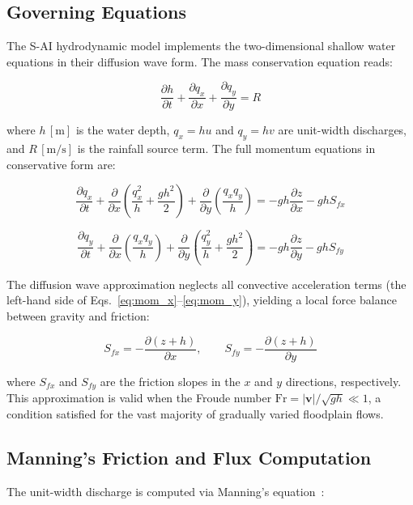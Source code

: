 \documentclass[11pt, a4paper]{article}
\newcommand{\vect}[1]{\boldsymbol{#1}}
\newcommand{\pd}[2]{\frac{\partial #1}{\partial #2}}
\begin{document}
\subsection{Governing Equations}

The S-AI hydrodynamic model implements the two-dimensional shallow water equations in their diffusion wave form. The mass conservation equation reads:

\begin{equation}
  \pd{h}{t} + \pd{q_x}{x} + \pd{q_y}{y} = R
  \label{eq:mass}
\end{equation}

\noindent where $h\,[\mathrm{m}]$ is the water depth, $q_x = hu$ and $q_y = hv$ are unit-width discharges, and $R\,[\mathrm{m/s}]$ is the rainfall source term. The full momentum equations in conservative form are:

\begin{equation}
  \pd{q_x}{t} + \pd{}{x}\!\left(\frac{q_x^2}{h} + \frac{gh^2}{2}\right) + \pd{}{y}\!\left(\frac{q_x q_y}{h}\right) = -gh\pd{z}{x} - ghS_{fx}
  \label{eq:mom_x}
\end{equation}

\begin{equation}
  \pd{q_y}{t} + \pd{}{x}\!\left(\frac{q_x q_y}{h}\right) + \pd{}{y}\!\left(\frac{q_y^2}{h} + \frac{gh^2}{2}\right) = -gh\pd{z}{y} - ghS_{fy}
  \label{eq:mom_y}
\end{equation}

The diffusion wave approximation neglects all convective acceleration terms (the left-hand side of Eqs.~\ref{eq:mom_x}--\ref{eq:mom_y}), yielding a local force balance between gravity and friction:

\begin{equation}
  S_{fx} = -\pd{(z+h)}{x}, \qquad S_{fy} = -\pd{(z+h)}{y}
  \label{eq:friction_slope}
\end{equation}

\noindent where $S_{fx}$ and $S_{fy}$ are the friction slopes in the $x$ and $y$ directions, respectively. This approximation is valid when the Froude number $\mathrm{Fr} = |\vect{v}|/\sqrt{gh} \ll 1$, a condition satisfied for the vast majority of gradually varied floodplain flows.

\subsection{Manning's Friction and Flux Computation}

The unit-width discharge is computed via Manning's equation~\cite{manning}:
\end{document}
